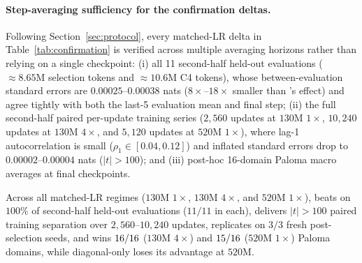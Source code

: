 \paragraph{Step-averaging sufficiency for the confirmation deltas.}
Following Section~\ref{sec:protocol}, every matched-LR delta in
Table~\ref{tab:confirmation} is verified across multiple averaging horizons
rather than relying on a single checkpoint: (i) all 11 second-half held-out
evaluations ($\approx 8.65\text{M}$ selection tokens and $\approx 10.6\text{M}$
C4 tokens), whose between-evaluation standard errors are $0.00025$--$0.00038$
nats ($8\times$--$18\times$ smaller than 's effect) and agree
tightly with both the last-5 evaluation mean and final step; (ii) the full
second-half paired per-update training series ($2{,}560$ updates at
$130\text{M}$ $1\times$, $10{,}240$ updates at $130\text{M}$ $4\times$, and
$5{,}120$ updates at $520\text{M}$ $1\times$), where lag-1 autocorrelation is
small ($\rho_1 \in [0.04, 0.12]$) and inflated standard errors drop to
$0.00002$--$0.00004$ nats ($|t| > 100$); and (iii) post-hoc 16-domain Paloma
macro averages at final checkpoints.

\begin{finding}
Across all matched-LR regimes ($130\text{M}$ $1\times$, $130\text{M}$ $4\times$,
and $520\text{M}$ $1\times$),  beats  on $100\%$
of second-half held-out evaluations ($11/11$ in each), delivers
$|t| > 100$ paired training separation over $2{,}560$--$10{,}240$ updates,
replicates on $3/3$ fresh post-selection seeds, and wins
$16{}/16$ ($130\text{M}$ $4\times$) and
$15{}/16$ ($520\text{M}$ $1\times$) Paloma domains, while
diagonal-only  loses its advantage at $520\text{M}$.
\end{finding}
